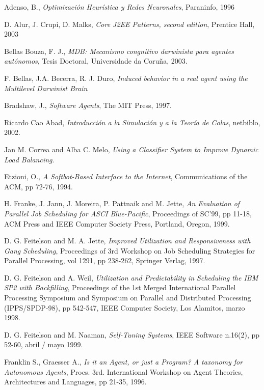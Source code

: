 \begin{thebibliography}{999}

Adenso, B., {\it Optimización Heurística y Redes Neuronales}, Paraninfo, 1996

D. Alur, J. Crupi, D. Malks, {\it Core J2EE Patterns, second edition}, Prentice Hall, 2003

Bellas Bouza, F. J., {\it MDB: Mecanismo congnitivo darwinista para agentes autónomos}, Tesis Doctoral, Universidade da Coruña, 2003.

F. Bellas, J.A. Becerra,  R. J. Duro, {\it Induced behavior in a real agent using the Multilevel Darwinist Brain}

Bradshaw, J., \emph{Software Agents}, The MIT Press, 1997.

Ricardo Cao Abad, {\it Introducción a la Simulación y a la Teoría de Colas}, netbiblo, 2002.

Jan M. Correa and Alba C. Melo, {\it Using a Classifier System to Improve Dynamic Load Balancing}.

Etzioni, O., {\it A Softbot-Based Interface to the Internet}, Communications of the ACM, pp 72-76, 1994.

H. Franke, J. Jann, J. Moreira, P. Pattnaik and M. Jette, 
{\it An Evaluation of Parallel Job Scheduling for ASCI Blue-Pacific}, 
Proceedings of SC'99, pp 11-18, ACM Press and IEEE Computer Society Press, Portland, Oregon, 1999.

D. G. Feitelson and M. A. Jette, 
{\it Improved Utilization and Responsiveness with Gang Scheduling}, 
Proceedings of 3rd Workshop on Job Scheduling Strategies for Parallel Processing, 
vol 1291, pp 238-262, Springer Verlag, 1997.

D. G. Feitelson and A. Weil, 
{\it Utilization and Predictability in Scheduling the IBM SP2 with Backfilling}, 
Proceedings of the 1st Merged International Parallel Processing Symposium and Symposium on Parallel 
and Distributed Processing (IPPS/SPDP-98), pp 542-547, IEEE Computer Society, Los Alamitos, marzo 1998.

D. G. Feitelson and M. Naaman, {\it Self-Tuning Systems}, 
IEEE Software n.16(2), pp 52-60, abril / mayo 1999.

Franklin S., Graesser A., {\it Is it an Agent, or just a Program? A taxonomy for
Autonomous Agents}, Procs. 3rd. International Workshop on Agent Theories, Architectures and Languages, pp 21-35, 1996.


\end{thebibliography}
